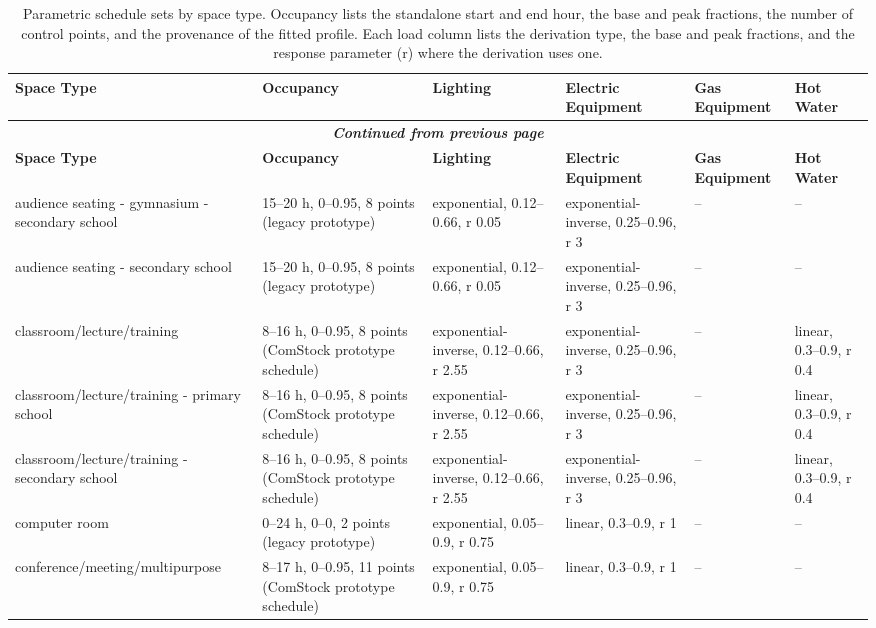 \begin{center}
\scriptsize
\begin{longtable}{|p{1.5in}|p{1.6in}|p{0.95in}|p{0.95in}|p{0.8in}|p{0.8in}|}
\caption[Parametric Schedule Sets by Space Type]{Parametric schedule sets by space type. Occupancy lists the standalone start and end hour, the base and peak fractions, the number of control points, and the provenance of the fitted profile. Each load column lists the derivation type, the base and peak fractions, and the response parameter (r) where the derivation uses one.} \\ \hline
\label{tab:parametric_schedule_sets}
\textbf{Space Type} & \textbf{Occupancy} & \textbf{Lighting} & \textbf{Electric Equipment} & \textbf{Gas Equipment} & \textbf{Hot Water} \\ \hline
\endfirsthead
\multicolumn{6}{c}{{\bfseries \textit{Continued from previous page}}} \\ \hline
\textbf{Space Type} & \textbf{Occupancy} & \textbf{Lighting} & \textbf{Electric Equipment} & \textbf{Gas Equipment} & \textbf{Hot Water} \\ \hline
\endhead
audience seating - gymnasium - secondary school & 15--20 h, 0--0.95, 8 points (legacy prototype) & exponential, 0.12--0.66, r 0.05 & exponential-inverse, 0.25--0.96, r 3 & -- & -- \\ \hline
audience seating - secondary school & 15--20 h, 0--0.95, 8 points (legacy prototype) & exponential, 0.12--0.66, r 0.05 & exponential-inverse, 0.25--0.96, r 3 & -- & -- \\ \hline
classroom/lecture/training & 8--16 h, 0--0.95, 8 points (ComStock prototype schedule) & exponential-inverse, 0.12--0.66, r 2.55 & exponential-inverse, 0.25--0.96, r 3 & -- & linear, 0.3--0.9, r 0.4 \\ \hline
classroom/lecture/training - primary school & 8--16 h, 0--0.95, 8 points (ComStock prototype schedule) & exponential-inverse, 0.12--0.66, r 2.55 & exponential-inverse, 0.25--0.96, r 3 & -- & linear, 0.3--0.9, r 0.4 \\ \hline
classroom/lecture/training - secondary school & 8--16 h, 0--0.95, 8 points (ComStock prototype schedule) & exponential-inverse, 0.12--0.66, r 2.55 & exponential-inverse, 0.25--0.96, r 3 & -- & linear, 0.3--0.9, r 0.4 \\ \hline
computer room & 0--24 h, 0--0, 2 points (legacy prototype) & exponential, 0.05--0.9, r 0.75 & linear, 0.3--0.9, r 1 & -- & -- \\ \hline
conference/meeting/multipurpose & 8--17 h, 0--0.95, 11 points (ComStock prototype schedule) & exponential, 0.05--0.9, r 0.75 & linear, 0.3--0.9, r 1 & -- & -- \\ \hline

\end{longtable}
\end{center}
